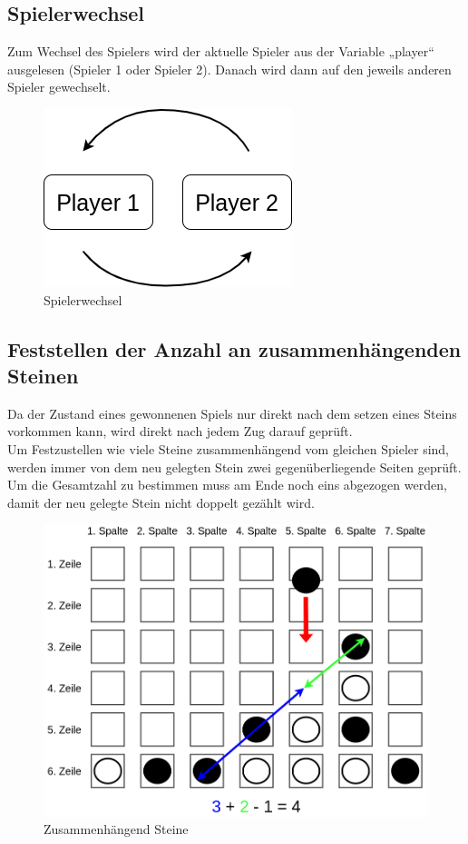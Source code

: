     \subsection{Spielerwechsel}
        Zum Wechsel des Spielers wird der aktuelle Spieler aus der Variable „player“ ausgelesen (Spieler 1 oder Spieler 2).
        Danach wird dann auf den jeweils anderen Spieler gewechselt.

        \begin{figure}[H]
            \centering
            \includegraphics[scale=0.5]{img/spielerwechsel.png}    
            \caption{Spielerwechsel}
        \end{figure}


    \subsection{Feststellen der Anzahl an zusammenhängenden Steinen}
        Da der Zustand eines gewonnenen Spiels nur direkt nach dem setzen eines Steins vorkommen kann,
        wird direkt nach jedem Zug darauf geprüft.
        \\
        Um Festzustellen wie viele Steine zusammenhängend vom gleichen Spieler sind,
        werden immer von dem neu gelegten Stein zwei gegenüberliegende Seiten geprüft.
        Um die Gesamtzahl zu bestimmen muss am Ende noch eins abgezogen werden,
        damit der neu gelegte Stein nicht doppelt gezählt wird.

        \begin{figure}[H]
            \centering
            \includegraphics[scale=0.3]{img/gewinnbedingung.png}    
            \caption{Zusammenhängend Steine}
        \end{figure}

